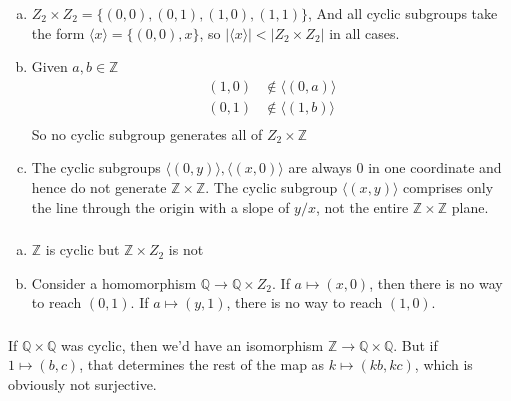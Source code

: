 \documentclass{article}
\newcommand{\ints}{\mathbb{Z}}
\newcommand{\rats}{\mathbb{Q}}
\newcommand{\set}[1]{ \{ #1 \} }
\newcommand{\norm}[1]{|#1|}
\newcommand{\cyclic}[1]{\langle#1\rangle}
\begin{document}
\subsubsection{}\label{ex3p12}
\begin{enumerate}[(a)]
\item $Z_2\times Z_2 = \set{(0,0), (0,1), (1,0), (1,1)}$,
And all cyclic subgroups take the form $\cyclic{x}=\set{(0,0), x}$, so $\norm{\cyclic{x}} < \norm{Z_2\times Z_2}$ in all cases.\\
\item Given $a,b \in \ints$
\begin{align*}
(1,0) &\notin \cyclic{(0,a)}\\
(0,1) &\notin \cyclic{(1,b)}\\
\end{align*}
So no cyclic subgroup generates all of $Z_2 \times \ints$
\item The cyclic subgroups $\cyclic{(0,y)}, \cyclic{(x,0)}$ are always $0$ in one coordinate and hence do not generate $\ints\times\ints$. The cyclic subgroup $\cyclic{(x,y)}$ comprises only the line through the origin with a slope of $y/x$, not the entire $\ints\times\ints$ plane.
\end{enumerate}
\subsubsection{}\label{ex3p13}
\begin{enumerate}[(a)]
\item $\ints$ is cyclic but $\ints\times Z_2$ is not
\item Consider a homomorphism $\rats \to \rats\times Z_2$. If $a \mapsto (x,0)$, then there is no way to reach $(0,1)$. If $a \mapsto (y,1)$, there is no way to reach $(1,0)$. 
\end{enumerate}
\subsubsection{}\label{ex3p14}
\subsubsection{}\label{ex3p15}
If $\rats\times\rats$ was cyclic, then we'd have an isomorphism $\ints \to \rats\times\rats$. But if $1 \mapsto (b,c)$, that determines the rest of the map as $k \mapsto (kb,kc)$, which is obviously not surjective.
\end{document}
